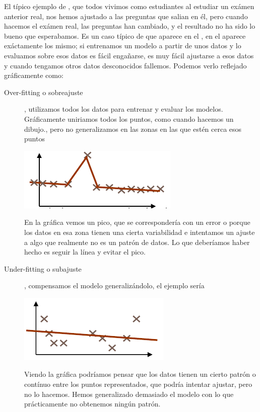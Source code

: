 El típico ejemplo de , que todos vivimos como estudiantes al estudiar un exámen anterior real, nos hemos ajustado a las preguntas que salian en él, pero cuando hacemos el exámen real, las preguntas han cambiado, y el resultado no ha sido lo bueno que esperabamos. Es un caso típico de  que aparece en el , en el  aparece exáctamente los mismo; si entrenamos un modelo a partir de unos datos y lo evaluamos sobre esos datos es fácil engañarse, es muy fácil ajustarse a esos datos y cuando tengamos otros datos desconocidos fallemos. Podemos verlo reflejado gráficamente como:
\begin{description}
    \item[Over-fitting o sobreajuste], utilizamos todos los datos para entrenar y evaluar los modelos. Gráficamente uniriamos todos los puntos, como cuando hacemos un dibujo., pero no generalizamos en las zonas en las que estén cerca esos puntos
    \begin{center}
        \includegraphics[scale=.65]{images/mod02-05_1.png}
    \end{center}
    En la gráfica vemos un pico, que se correspondería con un error o porque los datos en esa zona tienen una cierta variabilidad e intentamos un ajuste a algo que realmente no es un patrón de datos. Lo que deberíamos haber hecho es seguir la línea y evitar el pico.
    \item[Under-fitting o subajuste], compensamos el modelo generalizándolo, el ejemplo sería 
    \begin{center}
        \includegraphics[scale=.65]{images/mod02-05_2.png}
    \end{center}  
    Viendo la gráfica podríamos pensar que los datos tienen un cierto patrón o contínuo entre los puntos representados, que podría intentar ajustar, pero no lo hacemos. Hemos generalizado demasiado el modelo con lo que prácticamente no obtenemos ningún patrón.
\end{description}

